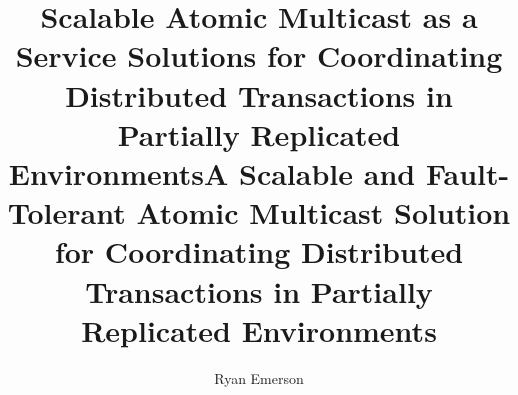 \title{Scalable Atomic Multicast as a Service Solutions for Coordinating Distributed Transactions in Partially Replicated Environments}
\title{A Scalable and Fault-Tolerant Atomic Multicast Solution for Coordinating Distributed Transactions in Partially Replicated Environments}

\author{Ryan Emerson}




 


\subject{LaTeX} 

